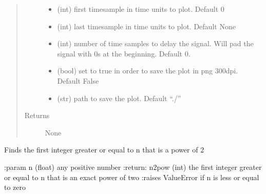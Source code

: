 \documentclass[letterpaper,10pt,english]{sphinxmanual}
\begin{document}
\begin{fulllineitems}
\begin{quote}
\begin{description}
\begin{itemize}
\item {} 
 \textendash{} (int)        first timesample in time units to plot. Default 0

\item {} 
 \textendash{} (int)        last timesample in time units to plot. Default None

\item {} 
 \textendash{} (int)        number of time samples to delay the signal. Will pad the signal with 0s at the
beginning. Default 0.

\item {} 
 \textendash{} (bool)       set to true in order to save the plot in png 300dpi. Default False

\item {} 
 \textendash{} (str)        path to save the plot. Default “./”

\end{itemize}

\item[{Returns}] \leavevmode
None

\end{description}\end{quote}

\end{fulllineitems}

\label{\detokenize{index:module-fullwaveqc.siganalysis}}

\begin{fulllineitems}
\label{\detokenize{index:fullwaveqc.siganalysis.closest2pow}}
Finds the first integer greater or equal to n that is a power of 2

:param   n          (float) any positive number
:return:  n2pow      (int) the first integer greater or equal to n that is an exact power of two
:raises  ValueError if n is less or equal to zero

\end{fulllineitems}
\end{document}
